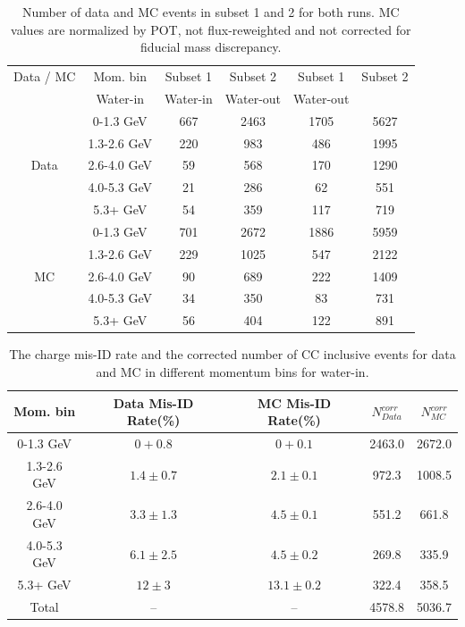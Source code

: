 \begin{table}
\caption{Number of data and MC events in subset 1 and 2 for both runs. MC values are normalized by POT, not flux-reweighted and not corrected for fiducial mass discrepancy.}
\label{tab:N_posneg}
\centering
\begin{tabular}{cccccc}\toprule
Data / MC & Mom. bin & Subset 1 & Subset 2 & Subset 1 & Subset 2\\
& Water-in & Water-in & Water-out & Water-out \\\midrule
& 0-1.3 GeV & 667 & 2463 & 1705 & 5627\\
& 1.3-2.6 GeV & 220 & 983 & 486 & 1995\\
Data & 2.6-4.0 GeV & 59 & 568 & 170 & 1290\\
& 4.0-5.3 GeV & 21 & 286 & 62 & 551\\
& 5.3+ GeV & 54 & 359 & 117 & 719 \\\midrule
& 0-1.3 GeV & 701 & 2672 & 1886 & 5959\\
& 1.3-2.6 GeV & 229 & 1025 & 547 & 2122\\
MC & 2.6-4.0 GeV & 90 & 689 & 222 & 1409\\
& 4.0-5.3 GeV & 34 & 350 & 83 & 731\\
& 5.3+ GeV & 56 & 404 & 122 & 891 \\
\bottomrule
\end{tabular}
\end{table}

\begin{table}
\caption{The charge mis-ID rate and the corrected number of CC inclusive events for data and MC in different momentum bins for water-in.}
\label{tab:N_corr_w}
\centering
\begin{tabular}{ccccc}\toprule
Mom. bin & Data Mis-ID Rate(\%) & MC Mis-ID Rate(\%) & $N^{corr}_{Data}$ & $N^{corr}_{MC}$ \\\midrule
0-1.3 GeV & $0+0.8$ & $0+0.1$ &2463.0 &2672.0 \\
1.3-2.6 GeV & $1.4\pm 0.7$ & $2.1\pm 0.1$  & 972.3 & 1008.5 \\
2.6-4.0 GeV & $3.3\pm 1.3$ & $4.5\pm 0.1$ & 551.2 & 661.8 \\
4.0-5.3 GeV & $6.1\pm 2.5$ & $4.5\pm 0.2$ & 269.8 & 335.9 \\
5.3+ GeV & $12\pm 3$ & $13.1\pm 0.2$  & 322.4 & 358.5 \\\midrule
Total & --  & --  & 4578.8 & 5036.7\\
\bottomrule
\end{tabular}
\end{table}

